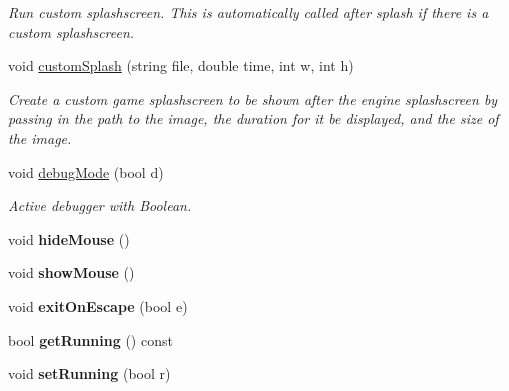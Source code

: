 \begin{DoxyCompactItemize}
\begin{DoxyCompactList}\small\item\em Run custom splashscreen. This is automatically called after splash if there is a custom splashscreen. \end{DoxyCompactList}\item 
void \hyperlink{classEngine_a0960e415d0b9ed92099eee6677d7ea51}{custom\+Splash} (string file, double time, int w, int h)\hypertarget{classEngine_a0960e415d0b9ed92099eee6677d7ea51}{}\label{classEngine_a0960e415d0b9ed92099eee6677d7ea51}

\begin{DoxyCompactList}\small\item\em Create a custom game splashscreen to be shown after the engine splashscreen by passing in the path to the image, the duration for it be displayed, and the size of the image. \end{DoxyCompactList}\item 
void \hyperlink{classEngine_a60d5307c4bc5005119086ff9f3e21624}{debug\+Mode} (bool d)\hypertarget{classEngine_a60d5307c4bc5005119086ff9f3e21624}{}\label{classEngine_a60d5307c4bc5005119086ff9f3e21624}

\begin{DoxyCompactList}\small\item\em Active debugger with Boolean. \end{DoxyCompactList}\item 
void {\bfseries hide\+Mouse} ()\hypertarget{classEngine_ab28645d6809f5335cc9034caaba38827}{}\label{classEngine_ab28645d6809f5335cc9034caaba38827}

\item 
void {\bfseries show\+Mouse} ()\hypertarget{classEngine_a6d476e93e46e59543ea9714b93a30936}{}\label{classEngine_a6d476e93e46e59543ea9714b93a30936}

\item 
void {\bfseries exit\+On\+Escape} (bool e)\hypertarget{classEngine_abe0b98e24e2f28d316df4eec13ab92c8}{}\label{classEngine_abe0b98e24e2f28d316df4eec13ab92c8}

\item 
bool {\bfseries get\+Running} () const \hypertarget{classEngine_a8261a8bc23adeaf5a17a1d6301223eda}{}\label{classEngine_a8261a8bc23adeaf5a17a1d6301223eda}

\item 
void {\bfseries set\+Running} (bool r)\hypertarget{classEngine_ac5a84be825afebf377e227bcb049a753}{}\label{classEngine_ac5a84be825afebf377e227bcb049a753}


\end{DoxyCompactItemize}
